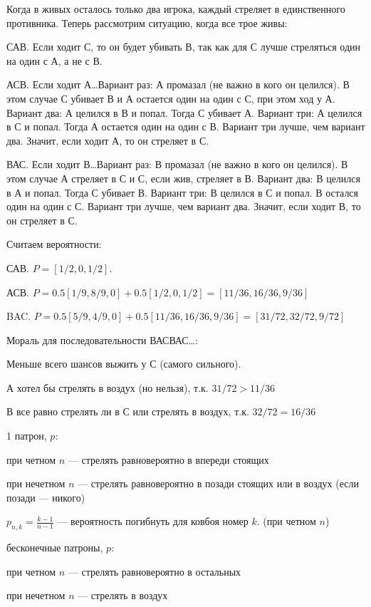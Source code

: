 \begin{solution}{6.19}

\end{solution}
\begin{solution}{6.20}
Когда в живых осталось только два игрока, каждый стреляет в единственного противника. Теперь рассмотрим ситуацию, когда все трое живы:

САВ. Если ходит С, то он будет убивать В, так как для С лучше стреляться один на один с А, а не с В.

АСВ. Если ходит А\ldots Вариант раз: А промазал (не важно в кого он целился). В этом случае С убивает В и А остается один на один с С, при этом ход у А.  Вариант два: А целился в В и попал. Тогда С убивает А. Вариант три: А целился в С и попал. Тогда А остается один на один с В. Вариант три лучше, чем вариант два. Значит, если ходит А, то он стреляет в С.

ВАС. Если ходит В\ldots Вариант раз: В промазал (не важно в кого он целился). В этом случае А стреляет в С и С, если жив, стреляет в В. Вариант два: В целился в А и попал. Тогда С убивает В. Вариант три: В целился в С и попал. В остался один на один с С. Вариант три лучше, чем вариант два. Значит, если ходит В, то он стреляет в С.

Считаем вероятности:

САВ. $P=[1/2,0,1/2]$.

АСВ. $P=0.5[1/9,8/9,0]+0.5[1/2,0,1/2]=[11/36,16/36,9/36]$

BAC. $P=0.5[5/9,4/9,0]+0.5[11/36,16/36,9/36]=[31/72,32/72,9/72]$

Мораль для последовательности ВАСВАС\ldots :

Меньше всего шансов выжить у С (самого сильного).

А хотел бы стрелять в воздух (но нельзя), т.к. $31/72>11/36$

В все равно стрелять ли в С или стрелять в воздух, т.к. $32/72=16/36$
\end{solution}
\begin{solution}{6.21}
1 патрон, $p$: \par
при четном $n$ --- стрелять равновероятно в впереди стоящих \par
при нечетном $n$ --- стрелять равновероятно в позади стоящих или в воздух (если позади --- никого) \par
$p_{n,k}=\frac{k-1}{n-1}$ --- вероятность погибнуть для ковбоя номер $k$. (при четном $n$) \par
бесконечные патроны, $p$: \par
при четном $n$ --- стрелять равновероятно в остальных \par
при нечетном $n$ --- стрелять в воздух
\end{solution}

